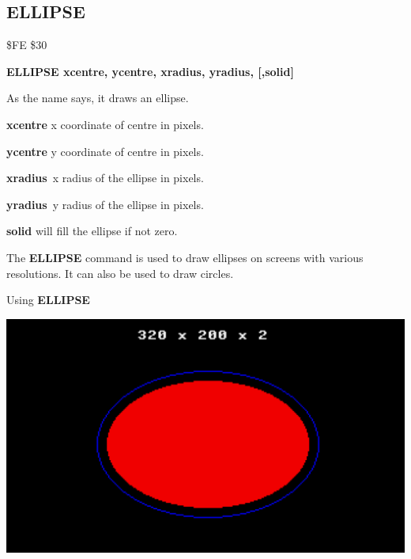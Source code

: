 \subsection{ELLIPSE}
\begin{description}[leftmargin=2cm,style=nextline]
\item [Token:] \$FE \$30
\item [Format:] {\bf ELLIPSE xcentre, ycentre,
                xradius, yradius, [,solid]}
\item [Usage:] As the name says, it draws an ellipse.

               {\bf xcentre} x coordinate of centre in pixels.

               {\bf ycentre} y coordinate of centre in pixels.

               {\bf xradius} x radius of the ellipse in pixels.

               {\bf yradius} y radius of the ellipse in pixels.

               {\bf solid} will fill the ellipse if not zero.

\item [Remarks:] The {\bf ELLIPSE} command is used to draw ellipses on
               screens with various resolutions.
               It can also be used to draw circles.

\item [Example:] Using {\bf ELLIPSE}


\includegraphics[width=\linewidth]{images/ellipse.png}


\end{description}

